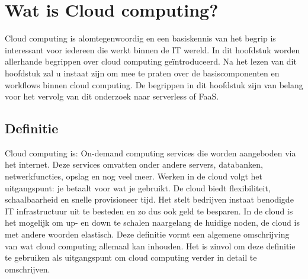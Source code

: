 \section{Wat is Cloud computing?}
\label{sec:wat-is-cloud-computing}
 
Cloud computing is alomtegenwoordig en een basiskennis van het begrip is interessant voor iedereen die werkt binnen de IT wereld. In dit hoofdstuk worden allerhande begrippen over cloud computing geïntroduceerd. Na het lezen van dit hoofdstuk zal u instaat zijn om mee te praten over de basiscomponenten en workflows binnen cloud computing. De begrippen in dit hoofdstuk zijn van belang voor het vervolg van dit onderzoek naar serverless of FaaS.

\subsection{Definitie}

Cloud computing is:
\newline
On-demand computing services die worden aangeboden via het internet. Deze services omvatten onder andere servers, databanken, netwerkfuncties, opslag en nog veel meer. Werken in de cloud volgt het uitgangspunt: je betaalt voor wat je gebruikt. De cloud biedt flexibiliteit, schaalbaarheid en snelle provisioneer tijd. Het stelt bedrijven instaat benodigde IT infrastructuur uit te besteden en zo dus ook geld te besparen. In de cloud is het mogelijk om up- en down te schalen naargelang de huidige noden, de cloud is met andere woorden elastisch. \autocite{Davis2017}
\newline
\newline
Deze definitie vormt een algemene omschrijving van wat cloud computing allemaal kan inhouden. Het is zinvol om deze definitie te gebruiken als uitgangspunt om cloud computing verder in detail te omschrijven.

